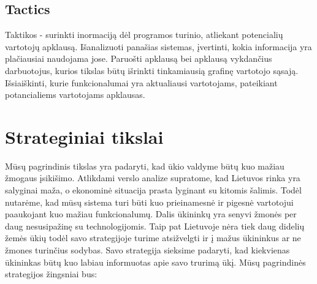 \documentclass[oneside]{VUMIFPSkursinis}
\begin{document}
\subsection{Tactics}
Taktikos - surinkti inormaciją dėl programos turinio, atliekant potencialių vartotojų apklausą.
Išanalizuoti panašias sistemas, įvertinti, kokia informacija yra plačiausiai naudojama jose.
Paruošti apklausą bei apklausą vykdančius darbuotojus, kurios tikslas būtų išrinkti tinkamiausią grafinę vartotojo sąsają.
Išsiaiškinti, kurie funkcionalumai yra aktualiausi vartotojams, pateikiant potancialiems vartotojams apklausas.
\section{Strateginiai tikslai}
	Mūsų pagrindinis tikslas yra padaryti, kad ūkio valdyme būtų kuo mažiau žmogaus įsikišimo. Atlikdami verslo analize supratome, kad Lietuvos rinka yra salyginai maža, o ekonominė situacija prasta lyginant su kitomis šalimis. Todėl nutarėme, kad mūsų sistema turi būti kuo prieinamesnė ir pigesnė vartotojui paaukojant kuo mažiau funkcionalumų. Dalis ūkininkų yra senyvi žmonės per daug nesusipažinę su technologijomis. Taip pat Lietuvoje nėra tiek daug didelių žemės ūkių todėl savo strategijoje turime atsižvelgti ir į mažus ūkininkus ar ne žmones turinčius sodybas. Savo strategija sieksime padaryti, kad kiekvienas ūkininkas būtų kuo labiau informuotas apie savo trurimą ūkį. Mūsų pagrindinės strategijos žingsniai bus:
\end{document}

